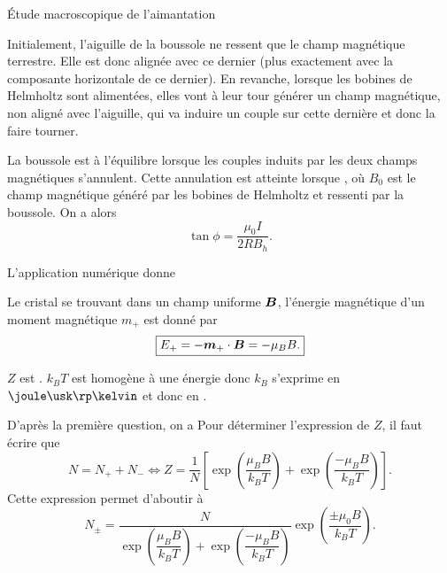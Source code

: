\begin{corr}{Étude macroscopique de l'aimantation}
	\begin{corrlist}
		\item Initialement, l'aiguille de la boussole ne ressent que le
		  champ magnétique terrestre. Elle est donc alignée avec ce dernier
		  (plus exactement avec la composante horizontale de ce dernier).
		  En revanche, lorsque les bobines de Helmholtz sont alimentées,
		  elles vont à leur tour générer un champ magnétique, 
		  non aligné avec l'aiguille, qui va induire 
		  un couple sur cette dernière et donc la faire tourner.
		\item La boussole est à l'équilibre lorsque les couples induits
		  par les deux champs magnétiques s'annulent. Cette annulation
		  est atteinte lorsque , où
		  $B_0$ est le champ magnétique généré par les bobines de Helmholtz
		  et ressenti par la boussole. On a alors
		  \begin{equation*}
			  \boxed{\tan \phi = \dfrac{\mu_0 I}{2 R B_h}.}
		  \end{equation*}
	  \item L'application numérique donne 
\end{corrlist}


\begin{corrlist}
\item Le cristal se trouvant dans un champ uniforme $\vecb$, l'énergie magnétique
  d'un moment magnétique $m_+$ est donné par 
  \begin{equation*}
	  \boxed{E_+ = -\vecm_+ \cdot \vecb = -\mu_B B.}
  \end{equation*}

  \item $Z$ est . $k_B T$ est homogène à une énergie donc $k_B$
    s'exprime en $\joule \usk \rp \kelvin$ et donc en \fbox{$\kilogram \usk \meter
    \squared \usk \second \rpsquare \usk \rp \kelvin$}.
  \item D'après la première question, on a 
    Pour déterminer l'expression de $Z$, il faut écrire que 
    \begin{equation*}
	    N = N_+ + N_- \iff \boxed{Z = \dfrac{1}{N}\left[
		    \exp\left(\dfrac{\mu_B B}{k_B T}\right) + 
    \exp\left(\dfrac{-\mu_B B}{k_B T}\right) \right].}
    \end{equation*}
    Cette expression permet d'aboutir à  
    \begin{equation*}
	    \boxed{N_\pm = \dfrac{N}{\exp\left(\dfrac{\mu_B B}{k_B T}\right) + 
		    \exp\left(\dfrac{-\mu_B B}{k_B T}\right)} 
	    \exp\left(\dfrac{\pm \mu_0 B}{k_BT}\right).}
    \end{equation*}


\end{corrlist}
\end{corr}
